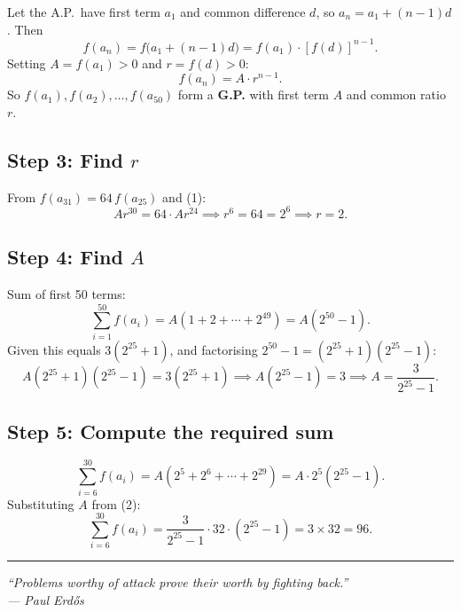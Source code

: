 \documentclass[12pt]{article}
\begin{document}
Let the A.P.\ have first term $a_1$ and common difference $d$, so $a_n=a_1+(n-1)d$. Then
\[
  f(a_n)=f\!\bigl(a_1+(n-1)d\bigr)=f(a_1)\cdot[f(d)]^{n-1}.
\]
Setting $A=f(a_1)>0$ and $r=f(d)>0$:
\[
  f(a_n)=A\cdot r^{n-1}. \tag{1}
\]
So $f(a_1),f(a_2),\ldots,f(a_{50})$ form a \textbf{G.P.} with first term $A$ and common ratio $r$.

\subsection*{Step 3: Find $r$}

From $f(a_{31})=64\,f(a_{25})$ and (1):
\[
  Ar^{30}=64\cdot Ar^{24}
  \implies r^6=64=2^6
  \implies \boxed{r=2.}
\]

\subsection*{Step 4: Find $A$}

Sum of first 50 terms:
\[
  \sum_{i=1}^{50}f(a_i)=A(1+2+\cdots+2^{49})=A(2^{50}-1).
\]
Given this equals $3(2^{25}+1)$, and factorising $2^{50}-1=(2^{25}+1)(2^{25}-1)$:
\[
  A(2^{25}+1)(2^{25}-1)=3(2^{25}+1)
  \implies A(2^{25}-1)=3
  \implies \boxed{A=\dfrac{3}{2^{25}-1}.} \tag{2}
\]

\subsection*{Step 5: Compute the required sum}

\[
  \sum_{i=6}^{30}f(a_i)
  =A(2^5+2^6+\cdots+2^{29})
  =A\cdot 2^5(2^{25}-1).
\]
Substituting $A$ from (2):
\[
  \sum_{i=6}^{30}f(a_i)
  =\frac{3}{2^{25}-1}\cdot 32\cdot(2^{25}-1)
  =3\times 32
  =\boxed{96.}
\]

\vspace{8pt}
\noindent\rule{\linewidth}{0.4pt}
\vspace{4pt}
\begin{center}
\itshape
``Problems worthy of attack prove their worth by fighting back.''\\[1pt]
--- Paul Erd\H{o}s
\end{center}
\end{document}
